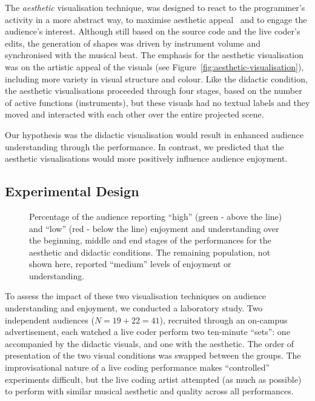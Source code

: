 \documentclass{sig-alternate}
\begin{document}
The \emph{aesthetic} visualisation technique, was designed to react to
the programmer's activity in a more abstract way, to maximise
aesthetic appeal~\citep{Cawthon2007} and to engage the audience's
interest. Although still based on the source code and the live coder's
edits, the generation of shapes was driven by instrument volume and
synchronised with the musical beat. The emphasis for the aesthetic
visualisation was on the artistic appeal of the visuals (see
Figure~\ref{fig:aesthetic-visualisation}), including more variety in
visual structure and colour. Like the didactic condition, the
aesthetic visualisations proceeded through four stages, based on the
number of active functions (instruments), but these visuals had no
textual labels and they moved and interacted with each other over the
entire projected scene.

Our hypothesis was the didactic visualisation would result in enhanced
audience understanding through the performance. In contrast, we
predicted that the aesthetic visualisations would more positively
influence audience enjoyment.

\subsection*{Experimental Design}

\begin{figure*}
\centering
{}
\caption{Percentage of the audience reporting ``high'' (green - above
the line) and ``low'' (red - below the line) enjoyment and
understanding over the beginning, middle and end stages of the
performances for the aesthetic and didactic conditions. The remaining
population, not shown here, reported ``medium'' levels of enjoyment or
understanding.}
\label{fig:enjoyment-understanding}
\end{figure*}

To assess the impact of these two visualisation techniques on audience
understanding and enjoyment, we conducted a laboratory study. Two
independent audiences ($N=19+22=41$), recruited through an on-campus
advertisement, each watched a live coder perform two ten-minute
``sets'': one accompanied by the didactic visuals, and one with the
aesthetic. The order of presentation of the two visual conditions was
swapped between the groups. The improvisational nature of a live
coding performance makes ``controlled'' experiments difficult, but the
live coding artist attempted (as much as possible) to perform with
similar musical aesthetic and quality across all performances.
\end{document}
